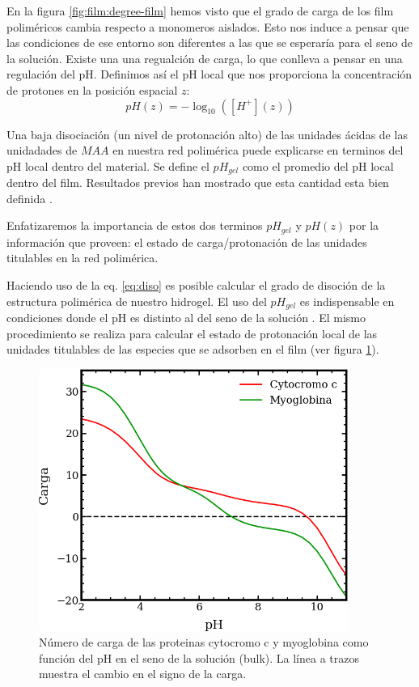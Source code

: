 En la figura \ref{fig:film:degree-film} hemos visto que el grado de carga de los film polim\'ericos cambia respecto a monomeros aislados. Esto nos induce a pensar que las condiciones de ese entorno son diferentes a las que se esperar\'ia para el seno de la soluci\'on. Existe una una regualci\'on de carga, lo que conlleva a pensar en una regulaci\'on del pH.
Definimos as\'i el pH local que nos proporciona la concentraci\'on de protones  en la posici\'on espacial $z$:
\begin{equation}
    pH(z) = -\log_{10}([H^+](z))
    \label{eq:pH-local}
\end{equation}

Una baja disociaci\'on (un nivel de protonaci\'on alto) de las unidades \'acidas de las unidadades de $MAA$ en nuestra red polim\'erica puede explicarse en terminos del pH local dentro del material. Se define el $pH_{gel}$ como el promedio del pH local dentro del film. Resultados previos han mostrado que esta cantidad esta bien definida \addcite. 

Enfatizaremos la importancia de estos dos terminos $pH_{gel}$ y $pH(z)$ por la informaci\'on que proveen: el estado de carga/protonaci\'on de las unidades titulables en la red polim\'erica. 

Haciendo uso de la eq. \ref{eq:diso} es posible calcular el grado de disoci\'on de la estructura polim\'erica de nuestro hidrogel. El uso del $pH_{gel}$ es indispensable en condiciones donde el pH es distinto al  del seno de la soluci\'on \addcite. El mismo procedimiento se realiza para calcular el estado de protonaci\'on local de las unidades titulables de las especies que se adsorben en el film (ver figura \ref{fig:film:protein-charge}).

\begin{figure}
    \centering
    \includegraphics[width=0.9\textwidth]{Figures/graph-film/carga-proteinas.png}
    \caption{N\'umero de carga de las proteinas cytocromo c y myoglobina como  funci\'on del pH en el seno de la soluci\'on (bulk). La l\'inea a trazos muestra el cambio en el signo de la carga.}
    \label{fig:film:protein-charge}
\end{figure}




